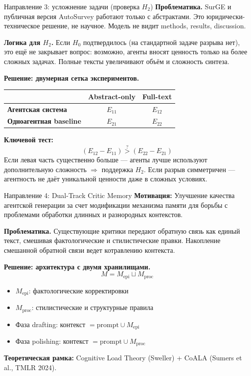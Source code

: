 \documentclass[10pt,aspectratio=169]{beamer}
\begin{document}
\begin{frame}{Направление 3: усложнение задачи (проверка $H_2$)}
  \textbf{Проблематика.} SurGE и публичная версия AutoSurvey работают только с абстрактами. Это юридически-техническое решение, не научное. Модель не видит methods, results, discussion.

  \vspace{0.3cm}
  \textbf{Логика для $H_2$.} Если $H_0$ подтвердилось (на стандартной задаче разрыва нет), это ещё не закрывает вопрос: возможно, агенты вносят ценность только на более сложных задачах. Полные тексты увеличивают объём и сложность синтеза.

  \vspace{0.3cm}
  \textbf{Решение: двумерная сетка экспериментов.}
  \begin{center}
    \begin{tabular}{lcc}
      \toprule
      & \textbf{Abstract-only} & \textbf{Full-text} \\
      \midrule
      \textbf{Агентская система} & $E_{11}$ & $E_{12}$ \\
      \textbf{Одноагентная baseline} & $E_{21}$ & $E_{22}$ \\
      \bottomrule
    \end{tabular}
  \end{center}

  \vspace{0.2cm}
  \textbf{Ключевой тест:}
  \[
    (E_{12} - E_{11}) \overset{?}{>} (E_{22} - E_{21})
  \]
  Если левая часть существенно больше --- агенты лучше используют дополнительную сложность $\Rightarrow$ поддержка $H_2$. Если разрыв симметричен --- агентность не даёт уникальной ценности даже в сложных условиях.
\end{frame}

\begin{frame}{Направление 4: Dual-Track Critic Memory}
  \textbf{Мотивация:} Улучшение качества агентской генерации за счет модификации механизма памяти для борьбы с проблемами обработки длинных и разнородных контекстов.

  \textbf{Проблематика.} Существующие критики передают обратную связь как единый текст, смешивая фактологические и стилистические правки. Накопление смешанной обратной связи ведет котравлению контекста.

  \textbf{Решение: архитектура с двумя хранилищами.}
  \[
    M = M_{\text{epi}} \sqcup M_{\text{proc}}
  \]
  \begin{itemize}
    \item $M_{\text{epi}}$: фактологические корректировки
    \item $M_{\text{proc}}$: стилистические и структурные правила
    \item Фаза drafting: контекст $= \text{prompt} \cup M_{\text{epi}}$
    \item Фаза polishing: контекст $= \text{prompt} \cup M_{\text{proc}}$
  \end{itemize}

  \textbf{Теоретическая рамка:} Cognitive Load Theory (Sweller) + CoALA (Sumers et al., TMLR 2024).
\end{frame}
\end{document}
